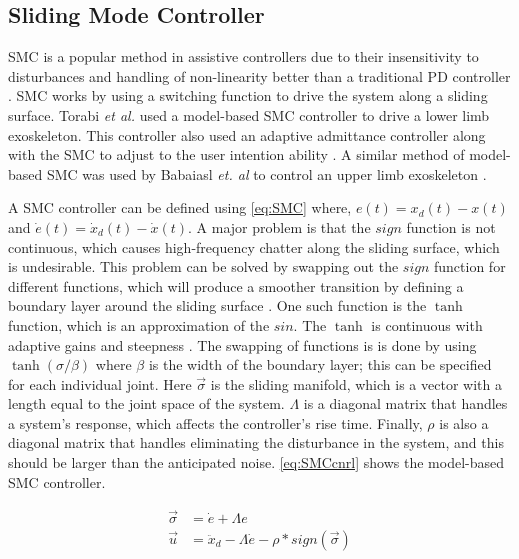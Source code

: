\subsection{Sliding Mode Controller}

SMC is a popular method in assistive controllers due to their insensitivity to disturbances and handling of non-linearity better than a traditional PD controller \cite{nasir2010performance} \cite{sanngoen2020review} \cite{fischer-SMC}. SMC works by using a switching function to drive the system along a sliding surface. Torabi \textit{et al.} used a model-based SMC controller to drive a lower limb exoskeleton. This controller also used an adaptive admittance controller along with the SMC to adjust to the user intention ability \cite{torabi2018robust}. A similar method of model-based SMC was used by Babaiasl \textit{et. al} to control an upper limb exoskeleton \cite{babaiasl2015sliding}.


A SMC controller can be defined using \autoref{eq:SMC} where, $e(t) = x_d(t) - x(t)$ and $\dot{e}(t) = \dot{x}_d(t) - \dot{x}(t)$. A major problem  is that the $sign$ function is not continuous, which causes high-frequency chatter along the sliding surface, which is undesirable. This problem can be solved by swapping out the $sign$  function for different functions, which will produce a smoother transition by defining a boundary layer around the sliding surface \cite{babaiasl2015sliding}. One such function is the $\tanh$ function, which is an approximation of the $sin$. The $\tanh$ is continuous with adaptive gains and steepness \cite{aghababa2012chattering}. The swapping of functions is is done by using $\tanh(\sigma / \beta)$ where $\beta$ is the width of the boundary layer; this can be specified for each individual joint. Here $\vec{\sigma}$ is the sliding manifold, which is a vector with a length equal to the joint space of the system. $\Lambda$ is a diagonal matrix that handles a system's response, which affects the controller's rise time. Finally, $\rho$ is also a diagonal matrix that handles eliminating the disturbance in the system, and this should be larger than the anticipated noise.  \autoref{eq:SMCcnrl} shows the model-based SMC controller.

\begin{equation}
   \begin{aligned} 
        \vec{\sigma} &=  \dot{e}  + \Lambda e \\
        \vec{u} &= \ddot{x}_d - \Lambda \dot{e} - \rho * sign(\vec{\sigma})
    \end{aligned}
    \label{eq:SMC}
\end{equation}






